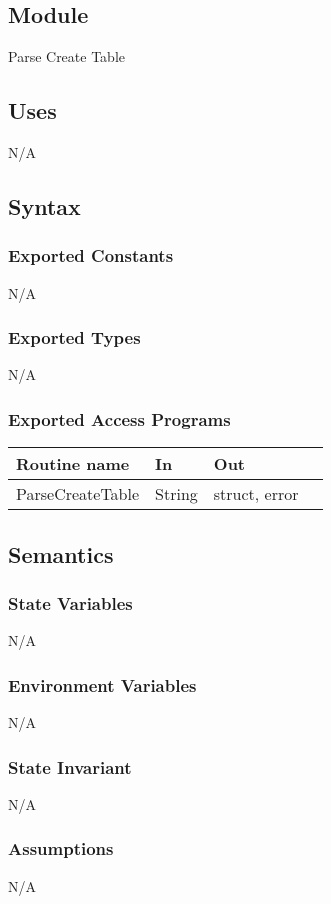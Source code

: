 \documentclass[12pt]{article}
\begin{document}
\subsection{Module}
Parse Create Table

\subsection{Uses}
N/A

\subsection{Syntax}
\subsubsection{Exported Constants}
N/A
\subsubsection{Exported Types}
N/A
\subsubsection{Exported Access Programs}
\begin{tabular}{| l | l | l | l |}
\hline
\textbf{Routine name} & \textbf{In} & \textbf{Out}\\
\hline
{\color{red}ParseCreateTable} & {\color{red}String} & {\color{red}struct, error} \\
\hline
\end{tabular}

\subsection{Semantics}
\subsubsection{State Variables}
N/A

\subsubsection{Environment Variables}
N/A

\subsubsection{State Invariant}
N/A

\subsubsection{Assumptions}
N/A
\end{document}
